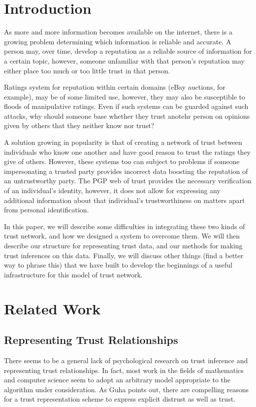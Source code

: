 \documentclass[onecolumn]{acm_proc_article-sp}
\begin{document}
\section{Introduction}
As more and more information becomes available on the internet, there is a growing problem determining which information is reliable and accurate.  A person may, over time, develop a reputation as a reliable source of information for a certain topic, however, someone unfamiliar with that person's reputation may either place too much or too little trust in that person.  

Ratings system for reputation within certain domains (eBay auctions, for example), may be of some limited use, however, they may also be susceptible to floods of manipulative ratings.  Even if such systems can be guarded against such attacks, why should someone base whether they trust anotehr person on opinions given by others that they neither know nor trust?

A solution growing in popularity is that of creating a network of trust between individuals who know one another and have good reason to trust the ratings they give of others.  However, these systems too can subject to problems if someone impersonating a trusted party provides incorrect data boosting the reputation of an untrustworthy party.  The PGP web of trust provides the necessary verification of an individual's identity, however, it does not allow for expressing any additional information about that individual's trustworthiness on matters apart from personal identification.

In this paper, we will describe some difficulties in integrating these two kinds of trust network, and how we designed a system to overcome them.  We will then describe our structure for representing trust data, and our methods for making trust inferences on this data.  Finally, we will discuss other things (find a better way to phrase this) that we have built to develop the beginnings of a useful infrastructure for this model of trust network.

\section{Related Work}

\subsection{Representing Trust Relationships}
There seems to be a general lack of psychological research on trust inference and representing trust relationships. In fact, most work in the fields of mathematics and computer science seem to adopt an arbitrary model appropriate to the algorithm under consideration. As Guha points out\cite{guha04propagation}, there are compelling reasons for a trust representation scheme to express explicit distrust as well as trust.
\end{document}
